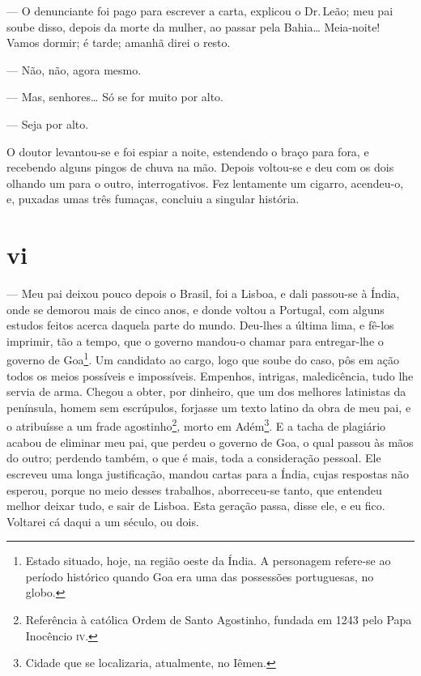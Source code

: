 --- O denunciante foi pago para escrever a carta, explicou o Dr.\,Leão;
meu pai soube disso, depois da morte da mulher, ao passar pela Bahia\ldots{}
Meia-noite! Vamos dormir; é tarde; amanhã direi o resto.

--- Não, não, agora mesmo.

--- Mas, senhores\ldots{} Só se for muito por alto.

--- Seja por alto.

O doutor levantou-se e foi espiar a noite, estendendo o braço para fora,
e recebendo alguns pingos de chuva na mão. Depois voltou-se e deu com os
dois olhando um para o outro, interrogativos. Fez lentamente um cigarro,
acendeu-o, e, puxadas umas três fumaças, concluiu a singular história.





\section*{vi}



--- Meu pai deixou pouco depois o Brasil, foi a Lisboa, e dali passou-se
à Índia, onde se demorou mais de cinco anos, e donde voltou a Portugal,
com alguns estudos feitos acerca daquela parte do mundo. Deu-lhes a
última lima, e fê-los imprimir, tão a tempo, que o governo mandou-o
chamar para entregar-lhe o governo de Goa\footnote{Estado situado, hoje,
  na região oeste da Índia. A personagem refere-se ao período histórico
  quando Goa era uma das possessões portuguesas, no globo.}. Um
candidato ao cargo, logo que soube do caso, pôs em ação todos os meios
possíveis e impossíveis. Empenhos, intrigas, maledicência, tudo lhe
servia de arma. Chegou a obter, por dinheiro, que um dos melhores
latinistas da península, homem sem escrúpulos, forjasse um texto latino
da obra de meu pai, e o atribuísse a um frade agostinho\footnote{Referência
  à católica Ordem de Santo Agostinho, fundada em 1243 pelo Papa
  Inocêncio \textsc{iv}.}, morto em Adém\footnote{Cidade que se localizaria,
  atualmente, no Iêmen.}. E a tacha de plagiário acabou de eliminar meu
pai, que perdeu o governo de Goa, o qual passou às mãos do outro;
perdendo também, o que é mais, toda a consideração pessoal. Ele escreveu
uma longa justificação, mandou cartas para a Índia, cujas respostas não
esperou, porque no meio desses trabalhos, aborreceu-se tanto, que
entendeu melhor deixar tudo, e sair de Lisboa. Esta geração passa, disse
ele, e eu fico. Voltarei cá daqui a um século, ou dois.

